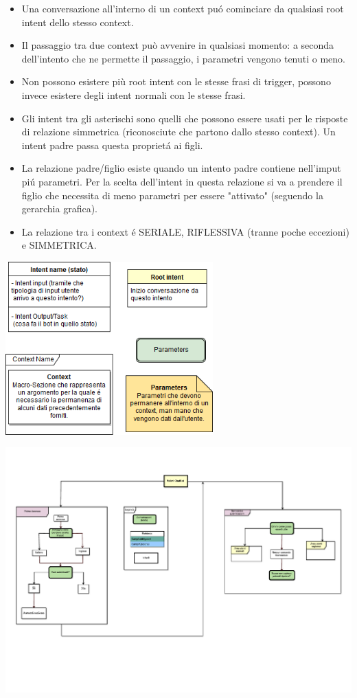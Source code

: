 \documentclass[]{article}
\begin{document}
\begin{itemize}
\item Una conversazione all'interno di un context puó cominciare da qualsiasi root intent dello stesso context.
\item Il passaggio tra due context può avvenire in qualsiasi momento: a seconda dell'intento che ne permette il passaggio, i parametri vengono tenuti o meno. 
\item Non possono esistere più root intent con le stesse frasi di trigger, possono invece esistere degli intent normali con le stesse frasi.
\item Gli intent tra gli asterischi sono quelli che possono essere usati per le risposte di relazione simmetrica (riconosciute che partono dallo stesso context). Un intent padre passa questa proprietá ai figli.
\item La relazione padre/figlio esiste quando un intento padre contiene nell'imput piú parametri. Per la scelta dell'intent in questa relazione si va a prendere il figlio che necessita di meno parametri per essere "attivato" (seguendo la gerarchia grafica).
\item La relazione tra i context é SERIALE, RIFLESSIVA (tranne poche eccezioni) e SIMMETRICA.
\end{itemize}



\begin{center}
\vspace*{0.05cm}
\includegraphics[width=0.6\textwidth]{flow2legend}
\end{center}

\pagebreak
\vspace*{-3cm} 
\includegraphics[width=2\textwidth, angle =90 ]{p01}
\thispagestyle{empty}
\end{document}
